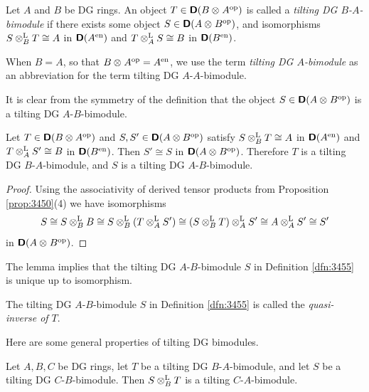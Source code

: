 \begin{dfn} \label{dfn:3455}
Let $A$ and $B$ be DG rings.
An object $T \in \boldsymbol{\mathsf{D}}(B \otimes_{} A^{\mathrm{op}})$
is called a {\em tilting DG $B$-$A$-bimodule} 
if there exists some object $S \in \boldsymbol{\mathsf{D}}(A \otimes_{} B^{\mathrm{op}})$,
and isomorphisms 
$S \otimes^{\mathrm{L}}_B T \cong A$ in $\boldsymbol{\mathsf{D}}(A^{\mathrm{en}})$
and
$T \otimes^{\mathrm{L}}_A S \cong B$ in $\boldsymbol{\mathsf{D}}(B^{\mathrm{en}})$.

When $B = A$, so that $B \otimes_{} A^{\mathrm{op}} = A^{\mathrm{en}}$,
we use the term {\em tilting DG $A$-bimodule} as an abbreviation for the term
tilting DG $A$-$A$-bimodule. 
\end{dfn}

It is clear from the symmetry of the definition that the object 
$S \in \boldsymbol{\mathsf{D}}(A \otimes_{} B^{\mathrm{op}})$ is a 
tilting DG $A$-$B$-bimodule. 

\begin{lem} \label{lem:3455}
Let $T \in \boldsymbol{\mathsf{D}}(B \otimes A^{\mathrm{op}})$ and 
$S, S' \in \boldsymbol{\mathsf{D}}(A \otimes B^{\mathrm{op}})$
satisfy 
$S \otimes^{\mathrm{L}}_B T \cong A$ in $\boldsymbol{\mathsf{D}}(A^{\mathrm{en}})$ 
and
$T \otimes^{\mathrm{L}}_A S' \cong B$ in $\boldsymbol{\mathsf{D}}(B^{\mathrm{en}})$.
Then 
$S' \cong S$ in $\boldsymbol{\mathsf{D}}(A \otimes_{} B^{\mathrm{op}})$.
Therefore $T$ is a tilting DG $B$-$A$-bimodule, and $S$ is a tilting 
DG $A$-$B$-bimodule. 
\end{lem}

\begin{proof}
Using the associativity of derived tensor products from Proposition \lb
\ref{prop:3450}(4)
we have isomorphisms 
\[ S \cong S \otimes^{\mathrm{L}}_B B \cong
S \otimes^{\mathrm{L}}_B (T \otimes^{\mathrm{L}}_A S') \cong 
(S \otimes^{\mathrm{L}}_B T) \otimes^{\mathrm{L}}_A S' \cong 
A \otimes^{\mathrm{L}}_A S' \cong S' \]
in $\boldsymbol{\mathsf{D}}(A \otimes_{} B^{\mathrm{op}})$. 
\end{proof}

The lemma implies that the tilting DG $A$-$B$-bimodule $S$ in Definition 
\ref{dfn:3455} is unique up to isomorphism.

\begin{dfn} \label{3460}
The tilting DG $A$-$B$-bimodule $S$ in Definition \ref{dfn:3455} is called 
the {\em quasi-inverse of $T$}. 
\end{dfn}

Here are some general properties of tilting DG bimodules. 

\begin{prop} \label{prop:3490}
Let $A, B, C$ be DG rings, let $T$ be a tilting DG $B$-$A$-bimodule, and let 
$S$ be a tilting DG $C$-$B$-bimodule. 
Then $S \otimes^{\mathrm{L}}_{B} T$ is a tilting $C$-$A$-bimodule. 
\end{prop}

